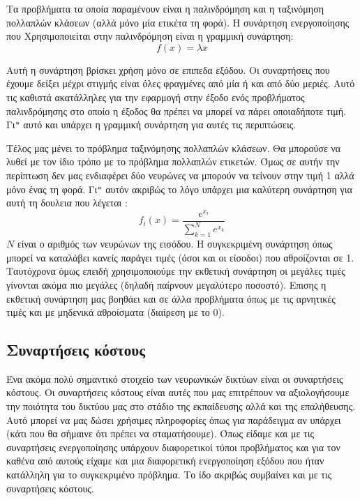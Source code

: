 Τα προβλήματα τα οποία παραμένουν είναι η παλινδρόμηση και η ταξινόμηση πολλαπλών κλάσεων (αλλά μόνο μία ετικέτα τη φορά). Η συνάρτηση ενεργοποίησης που Χρησιμοποιείται στην παλινδρόμηση είναι η γραμμική συνάρτηση:
$$f(x)=\lambda x$$
\begin{figure}[H]
    \centering
    \caption{}
\end{figure}
Αυτή η συνάρτηση βρίσκει χρήση μόνο σε επιπεδα εξόδου. Οι συναρτήσεις που έχουμε δείξει μέχρι στιγμής είναι όλες φραγμένες από μία ή και από δύο μεριές. Αυτό τις καθιστά ακατάλληλες για την εφαρμογή στην έξοδο ενός προβλήματος
παλινδρόμησης στο οποίο η έξοδος θα πρέπει να μπορεί να πάρει οποιαδήποτε τιμή. Γι\texttt{"} αυτό και υπάρχει η γραμμική συνάρτηση για αυτές τις περιπτώσεις.

Τέλος μας μένει το πρόβλημα ταξινόμησης πολλαπλών κλάσεων. Θα μπορούσε να λυθεί με τον ίδιο τρόπο με το πρόβλημα πολλαπλών ετικετών. Όμως σε αυτήν την περίπτωση δεν μας ενδιαφέρει δύο νευρώνες να μπορούν να τείνουν στην τιμή 1 αλλά μόνο
ένας τη φορά. Γι\texttt{"} αυτόν ακριβώς το λόγο υπάρχει μια καλύτερη συνάρτηση για αυτή τη δουλεια που λέγεται :
$$f_i(x)=\frac{e^{x_i}}{\sum\limits_{k=1}^Ne^{x_k}}$$
$N$ είναι ο αριθμός των νευρώνων της εισόδου. Η συγκεκριμένη συνάρτηση όπως μπορεί να καταλάβει κανείς παράγει τιμές (όσοι και οι είσοδοι) που αθροίζονται σε 1. Ταυτόχρονα όμως επειδή χρησιμοποιούμε την εκθετική συνάρτηση οι μεγάλες τιμές
γίνονται ακόμα πιο μεγάλες (δηλαδή παίρνουν μεγαλύτερο ποσοστό). Επισης η εκθετική συνάρτηση μας βοηθάει και σε άλλα προβλήματα όπως με τις αρνητικές τιμές  και με μηδενικά αθροίσματα (διαίρεση με το 0).

\subsection{Συναρτήσεις κόστους}
Ένα ακόμα πολύ σημαντικό στοιχείο των νευρωνικών δικτύων είναι οι συναρτήσεις κόστους. Οι συναρτήσεις κόστους είναι αυτές που μας επιτρέπουν να αξιολογήσουμε την ποιότητα του δικτύου μας στο στάδιο της εκπαίδευσης αλλά και της επαλήθευσης.
Αυτό μπορεί να μας δώσει χρήσιμες πληροφορίες όπως για παράδειγμα αν υπάρχει  (κάτι που θα σήμαινε ότι πρέπει να σταματήσουμε). Όπως είδαμε και με τις συναρτήσεις ενεργοποίησης υπάρχουν διαφορετικοί τύποι προβλήματος και
για τον καθένα από αυτούς είχαμε και μια διαφορετική ενεργοποίηση εξόδου που ήταν κατάλληλη για το συγκεκριμένο πρόβλημα. Το ίδο ακριβώς συμβαίνει και με τις συναρτήσεις κόστους.

